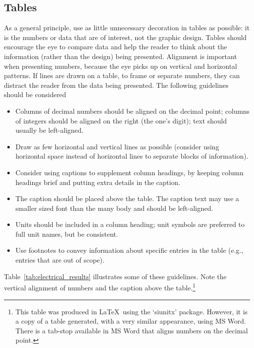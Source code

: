 \subsection{Tables}
As a general principle, use as little unnecessary decoration in tables as possible: it is the numbers or data that are of interest, not the graphic design. Tables should encourage the eye to compare data and help the reader to think about the information (rather than the design) being presented. 
Alignment is important when presenting numbers, because the eye picks up on vertical and horizontal patterns. If lines are drawn on a table, to frame or separate numbers, they can distract the reader from the data being presented. 
The following guidelines should be considered
\begin{itemize}
\item	Columns of decimal numbers should be aligned on the decimal point; columns of integers should be aligned on the right (the one's digit); text should usually be left-aligned.
\item	Draw as few horizontal and vertical lines as possible (consider using horizontal space instead of horizontal lines to separate blocks of information).
\item	Consider using captions to supplement column headings, by keeping column headings brief and putting extra details in the caption.
\item	The caption should be placed above the table. The caption text may use a smaller sized font than the many body and should be left-aligned.
\item	Units should be included in a column heading; unit symbols are preferred to full unit names, but be consistent.
\item	Use footnotes to convey information about specific entries in the table (e.g., entries that are out of scope).
\end{itemize}   
Table~\ref{tab:electrical_results} illustrates some of these guidelines. Note the vertical alignment of numbers and the caption above the table.\footnote{This table was produced in \LaTeX\ using the `siunitx' package. However, it is a copy of a table generated, with a very similar appearance, using MS Word. There is a tab-stop available in MS Word that aligns numbers on the decimal point.}

